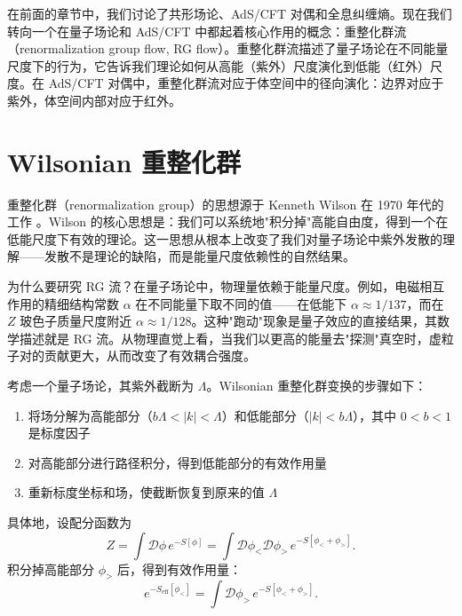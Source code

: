 
在前面的章节中，我们讨论了共形场论、AdS/CFT 对偶和全息纠缠熵。现在我们转向一个在量子场论和 AdS/CFT 中都起着核心作用的概念：重整化群流（renormalization group flow, RG flow）。重整化群流描述了量子场论在不同能量尺度下的行为，它告诉我们理论如何从高能（紫外）尺度演化到低能（红外）尺度。在 AdS/CFT 对偶中，重整化群流对应于体空间中的径向演化：边界对应于紫外，体空间内部对应于红外。

\section{Wilsonian 重整化群}

重整化群（renormalization group）的思想源于 Kenneth Wilson 在 1970 年代的工作 \cite{Wilson1974}。Wilson 的核心思想是：我们可以系统地"积分掉"高能自由度，得到一个在低能尺度下有效的理论。这一思想从根本上改变了我们对量子场论中紫外发散的理解——发散不是理论的缺陷，而是能量尺度依赖性的自然结果。

\begin{note}[物理动机]
为什么要研究 RG 流？在量子场论中，物理量依赖于能量尺度。例如，电磁相互作用的精细结构常数 $\alpha$ 在不同能量下取不同的值——在低能下 $\alpha \approx 1/137$，而在 $Z$ 玻色子质量尺度附近 $\alpha \approx 1/128$。这种"跑动"现象是量子效应的直接结果，其数学描述就是 RG 流。从物理直觉上看，当我们以更高的能量去"探测"真空时，虚粒子对的贡献更大，从而改变了有效耦合强度。
\end{note}

\begin{definition}\label{def:wilsonian_rg}
考虑一个量子场论，其紫外截断为 $\Lambda$。Wilsonian 重整化群变换的步骤如下：
\begin{enumerate}
    \item 将场分解为高能部分（$b\Lambda < |k| < \Lambda$）和低能部分（$|k| < b\Lambda$），其中 $0 < b < 1$ 是标度因子
    \item 对高能部分进行路径积分，得到低能部分的有效作用量
    \item 重新标度坐标和场，使截断恢复到原来的值 $\Lambda$
\end{enumerate}
具体地，设配分函数为
\begin{equation}
    Z = \int \mathcal{D}\phi \, e^{-S[\phi]} = \int \mathcal{D}\phi_< \mathcal{D}\phi_> \, e^{-S[\phi_< + \phi_>]}.
\end{equation}
积分掉高能部分 $\phi_>$ 后，得到有效作用量：
\begin{equation}
    e^{-S_{\text{eff}}[\phi_<]} = \int \mathcal{D}\phi_> \, e^{-S[\phi_< + \phi_>]}.
\end{equation}
\end{definition}

